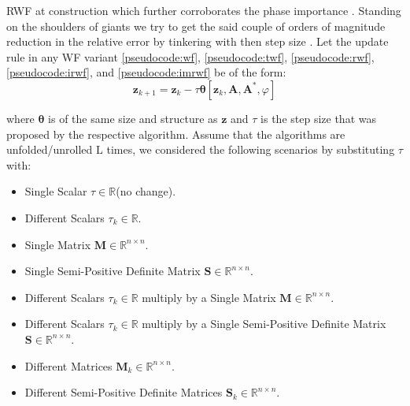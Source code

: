 \ac{RWF}\cite{Zhang2016} at construction which further corroborates the phase importance \cite{Oppenheim1979}\cite{Oppenheim1981}\cite{Shechtman2015}. 
Standing on the shoulders of giants \cite{Gregor2010} we try to get the said couple of orders of magnitude reduction in the relative error by 
tinkering with then step size \cite{Gregor2010}. Let the update rule in any 
\ac{WF}\cite{Liu2019}\cite{Jaganathan2015} variant \cref{pseudocode:wf}, \ref{pseudocode:twf}, \ref{pseudocode:rwf}, \ref{pseudocode:irwf}, and \ref{pseudocode:imrwf} be of the form:
\begin{equation*}
  \boldsymbol{z}_{k+1} = \boldsymbol{z}_k - \tau\boldsymbol{\theta}[\boldsymbol{z}_k,\boldsymbol{A},\boldsymbol{A^*},\varphi]
\end{equation*}

\noindent where $\boldsymbol{\theta}$ is of the same size and structure as $\boldsymbol{z}$ and $\tau$ is the step size that was 
proposed by the respective algorithm. Assume that the algorithms are unfolded/unrolled $\mathrm{L}$ times, we considered the following 
scenarios by substituting $\tau$ with:

\begin{itemize}
  \item Single Scalar $\tau \in \mathbb{R}$(no change).
  \item Different Scalars $\tau_k\in\mathbb{R}$.
  \item Single Matrix $\boldsymbol{M}\in \mathbb{R}^{n\times n}$.
  \item Single Semi-Positive Definite Matrix $\boldsymbol{S}\in \mathbb{R}^{n\times n}$.
  \item Different Scalars $\tau_k \in \mathbb{R}$ multiply by a Single Matrix $\boldsymbol{M} \in \mathbb{R}^{n\times n}$.
  \item Different Scalars $\tau_k \in \mathbb{R}$ multiply by a Single Semi-Positive Definite Matrix $\boldsymbol{S} \in \mathbb{R}^{n\times n}$.
  \item Different Matrices $\boldsymbol{M}_k\in \mathbb{R}^{n\times n}$.
  \item Different Semi-Positive Definite Matrices $\boldsymbol{S}_k\in \mathbb{R}^{n\times n}$.
\end{itemize}


